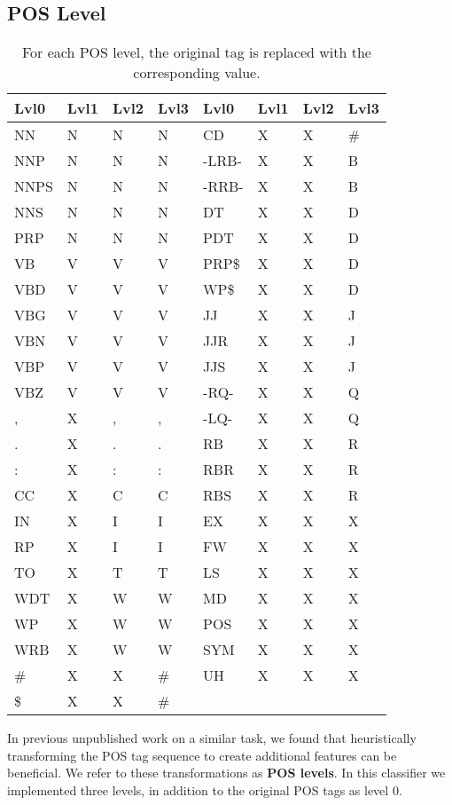 \documentclass[11pt]{article}
\begin{document}
\subsection{POS Level}
\label{sec-4-2}

\begin{table}[tbp]
\centering
\scriptsize

\begin{tabular}{llllllll}
Lvl0 & Lvl1 & Lvl2 & Lvl3 & Lvl0 & Lvl1 & Lvl2 & Lvl3\\
\hline
NN & N & N & N & CD & X & X & \#\\
NNP & N & N & N & -LRB- & X & X & B\\
NNPS & N & N & N & -RRB- & X & X & B\\
NNS & N & N & N & DT & X & X & D\\
PRP & N & N & N & PDT & X & X & D\\
VB & V & V & V & PRP\$ & X & X & D\\
VBD & V & V & V & WP\$ & X & X & D\\
VBG & V & V & V & JJ & X & X & J\\
VBN & V & V & V & JJR & X & X & J\\
VBP & V & V & V & JJS & X & X & J\\
VBZ & V & V & V & -RQ- & X & X & Q\\
, & X & , & , & -LQ- & X & X & Q\\
. & X & . & . & RB & X & X & R\\
: & X & : & : & RBR & X & X & R\\
CC & X & C & C & RBS & X & X & R\\
IN & X & I & I & EX & X & X & X\\
RP & X & I & I & FW & X & X & X\\
TO & X & T & T & LS & X & X & X\\
WDT & X & W & W & MD & X & X & X\\
WP & X & W & W & POS & X & X & X\\
WRB & X & W & W & SYM & X & X & X\\
\# & X & X & \# & UH & X & X & X\\
\$ & X & X & \# &  &  &  & \\
\end{tabular}

\caption{For each POS level, the original tag is replaced with the corresponding value.}
\label{tbl:pos-level}
\end{table}

In previous unpublished work on a similar task, we found that
heuristically transforming the POS tag sequence to create additional
features can be beneficial. We refer to these transformations as \textbf{POS
levels}. In this classifier we implemented three levels, in addition
to the original POS tags as level 0.
\end{document}

